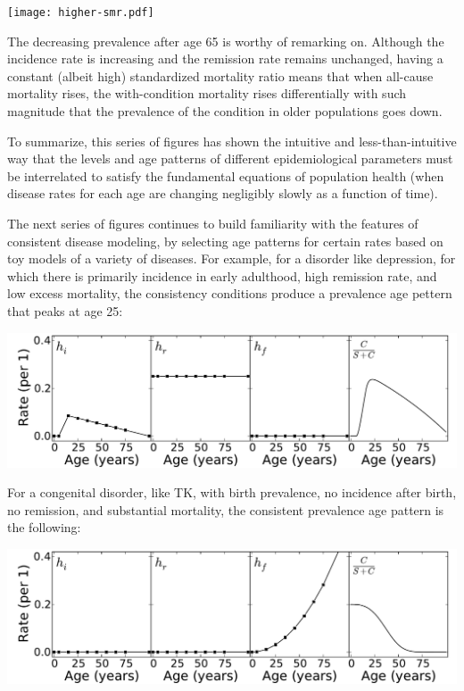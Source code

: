 \texttt{[image: higher-smr.pdf]}

The decreasing prevalence after age 65 is worthy of remarking
on. Although the incidence rate is increasing and the remission rate
remains unchanged, having a constant (albeit high) standardized
mortality ratio means that when all-cause mortality rises, the
with-condition mortality rises differentially with such magnitude that
the prevalence of the condition in older populations goes down.

To summarize, this series of figures has shown the intuitive and
less-than-intuitive way that the levels and age patterns of different
epidemiological parameters must be interrelated to satisfy the
fundamental equations of population health (when disease rates for
each age are changing negligibly slowly as a function of time).

The next series of figures continues to build familiarity with the
features of consistent disease modeling, by selecting age patterns for
certain rates based on toy models of a variety of diseases.  For
example, for a disorder like depression, for which there is primarily
incidence in early adulthood, high remission rate, and low excess
mortality, the consistency conditions produce a prevalence age pettern
that peaks at age 25: 

\includegraphics[width=\textwidth]{forward-sim-mental.pdf}

For a congenital disorder, like TK, with birth prevalence, no
incidence after birth, no remission, and substantial mortality, the
consistent prevalence age pattern is the following:

\includegraphics[width=\textwidth]{forward-sim-congenital.pdf}

